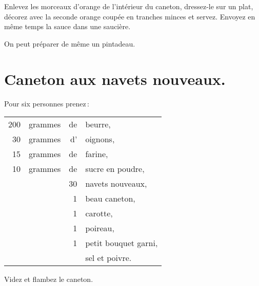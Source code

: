 Enlevez les morceaux d'orange de l'intérieur du caneton, dressez-le sur un
plat, décorez avec la seconde orange coupée en tranches minces et servez.
Envoyez en même temps la sauce dans une saucière.

\sk

On peut préparer de même un pintadeau.

\section*{\centering Caneton aux navets nouveaux.}
{}

Pour six personnes prenez :

\medskip

\footnotesize
\begin{longtable}{rrrp{16em}}
    200 & grammes & de & beurre,                                                                          \\
     30 & grammes & d’ & oignons,                                                                         \\
     15 & grammes & de & farine,                                                                          \\
     10 & grammes & de & sucre en poudre,                                                                 \\
        &         & 30 & navets nouveaux,                                                                 \\
        &         &  1 & beau caneton,                                                                    \\
        &         &  1 & carotte,                                                                         \\
        &         &  1 & poireau,                                                                         \\
        &         &  1 & petit bouquet garni,                                                             \\
        &         &    & sel et poivre.                                                                   \\
\end{longtable}
\normalsize

Videz et flambez le caneton.

